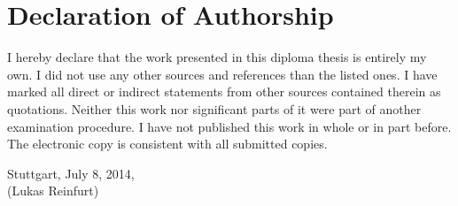 \chapter*{Declaration of Authorship}

\noindent
I hereby declare that the work presented in this diploma thesis is entirely my own.
I did not use any other sources and references than the listed ones.
I have marked all direct or indirect statements from other sources contained therein as quotations.
Neither this work nor significant parts of it were part of another examination procedure.
I have not published this work in whole or in part before.
The electronic copy is consistent with all submitted copies.

\vspace{4em}

\noindent
Stuttgart, July 8, 2014,\hspace{4em}\hdashrule[0.5ex][x]{8.5cm}{1pt}{1pt}\\
\phantom{Stuttgart, \today,}\hspace{4em}(Lukas Reinfurt)
